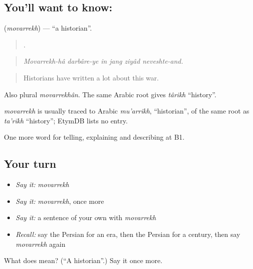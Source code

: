 \subsection*{You'll want to know: }
\textbf{} (\emph{movarrekh}) — \textquotedblleft{}a historian\textquotedblright{}.

\begin{quote}
       .
\end{quote}

\begin{quote}
\emph{Movarrekh-hâ darbâre-ye in jang ziyâd neveshte-and.}
\end{quote}

\begin{quote}
Historians have written a lot about this war.
\end{quote}

Also plural \emph{movarrekhân}. The same Arabic root gives \emph{târikh} \textquotedblleft{}history\textquotedblright{}.

\begin{cousinweb}
\emph{movarrekh} is usually traced to Arabic \emph{mu'arrikh}, \textquotedblleft{}historian\textquotedblright{}, of the same root as \emph{ta'rīkh} \textquotedblleft{}history\textquotedblright{}; EtymDB lists no entry.
\end{cousinweb}

\begin{grammarlens}[title={What you've built}]
One more word for telling, explaining and describing at B1.
\end{grammarlens}

\subsection*{Your turn}
\begin{itemize}
\raggedright
  \item \emph{Say it:} \emph{movarrekh}
  \item \emph{Say it:} \emph{movarrekh}, once more
  \item \emph{Say it:} a sentence of your own with \emph{movarrekh}
  \item \emph{Recall:} say the Persian for an era, then the Persian for a century, then say \emph{movarrekh} again
\end{itemize}

\begin{tcolorbox}[breakable,colback=teal!4,colframe=teal!35!black,title={Before you move on}]
What does  mean? (\textquotedblleft{}A historian\textquotedblright{}.) Say it once more.
\end{tcolorbox}
